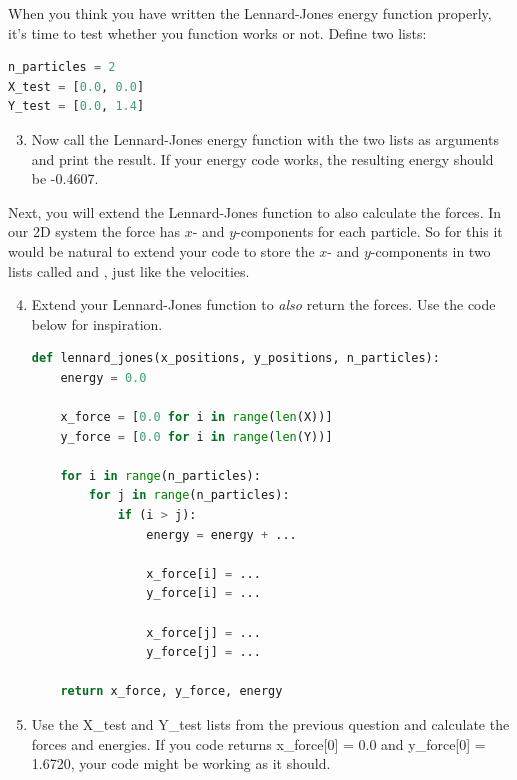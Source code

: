 \documentclass{article}
\begin{document}
When you think you have written the Lennard-Jones energy function properly,
it's time to test whether you function works or not.
Define two lists:

\begin{lstlisting}[language=python]
n_particles = 2
X_test = [0.0, 0.0]
Y_test = [0.0, 1.4]
\end{lstlisting}


\begin{enumerate}
    \setcounter{enumi}{2}

    \item Now call the Lennard-Jones energy function with the two lists as
        arguments and print the result. If your energy code works, the
        resulting energy should be -0.4607.

\end{enumerate}

Next, you will extend the Lennard-Jones function to also calculate
the forces. In our 2D system the force has $x$- and $y$-components for each
particle.
So for this it would be natural to extend your code to store the $x$- and
$y$-components in two lists called  and , just
like the velocities.

\begin{enumerate}
    \setcounter{enumi}{3}

    \item Extend your Lennard-Jones function to \textit{also} return the forces.
        Use the code below for inspiration.

\begin{lstlisting}[language=python]
def lennard_jones(x_positions, y_positions, n_particles):
    energy = 0.0

    x_force = [0.0 for i in range(len(X))]
    y_force = [0.0 for i in range(len(Y))]

    for i in range(n_particles):
        for j in range(n_particles):
            if (i > j):
                energy = energy + ...

                x_force[i] = ...
                y_force[i] = ...

                x_force[j] = ...
                y_force[j] = ...

    return x_force, y_force, energy

\end{lstlisting}

    \item Use the X\_test and Y\_test lists from the previous question and
        calculate the forces and energies.
        If you code returns x\_force[0] = 0.0 and y\_force[0] = 1.6720, your
        code might be working as it should.

\end{enumerate}
\end{document}
